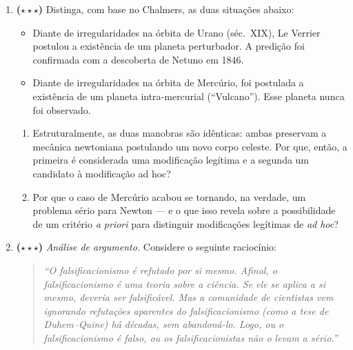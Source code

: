 \documentclass[10pt,a4paper]{extarticle}
\newcommand{\impt}[1]{\textcolor{important}{#1}}
\newcommand{\difiii}{$\star\star\star$}
\begin{document}
\begin{enumerate}[label=\textbf{\arabic*.}, leftmargin=*, start=5]
Ordene as três por grau de falseabilidade, do menos falsificável ao mais falsificável. Em seguida, comente o aparente paradoxo: \emph{a teoria mais arriscada de estar errada é, segundo Popper, a melhor cientificamente}. Como isso se reconcilia com a prática de engenharia de software, onde geralmente preferimos afirmações cautelosas?

\item \textbf{(\difiii)} Distinga, com base no Chalmers, as duas situações abaixo:

\begin{itemize}
    \item Diante de irregularidades na órbita de \impt{Urano} (séc.\ XIX), Le Verrier postulou a existência de um planeta perturbador. A predição foi confirmada com a descoberta de Netuno em 1846.
    \item Diante de irregularidades na órbita de \impt{Mercúrio}, foi postulada a existência de um planeta intra-mercurial (``Vulcano''). Esse planeta nunca foi observado.
\end{itemize}

\begin{enumerate}[label=(\alph*)]
    \item Estruturalmente, as duas manobras são idênticas: ambas preservam a mecânica newtoniana postulando um novo corpo celeste. Por que, então, a primeira é considerada uma modificação \impt{legítima} e a segunda um candidato à modificação \impt{ad hoc}?
    \item Por que o caso de Mercúrio acabou se tornando, na verdade, um problema sério para Newton --- e o que isso revela sobre a possibilidade de um critério \emph{a priori} para distinguir modificações legítimas de \emph{ad hoc}?
\end{enumerate}

\item \textbf{(\difiii)} \emph{Análise de argumento.} Considere o seguinte raciocínio:

\begin{quote}
\itshape ``O falsificacionismo é refutado por si mesmo. Afinal, o falsificacionismo é uma teoria \emph{sobre} a ciência. Se ele se aplica a si mesmo, deveria ser falsificável. Mas a comunidade de cientistas vem ignorando refutações aparentes do falsificacionismo (como a tese de Duhem--Quine) há décadas, sem abandoná-lo. Logo, ou o falsificacionismo é falso, ou os falsificacionistas não o levam a sério.''
\end{quote}


\end{enumerate}
\end{document}
